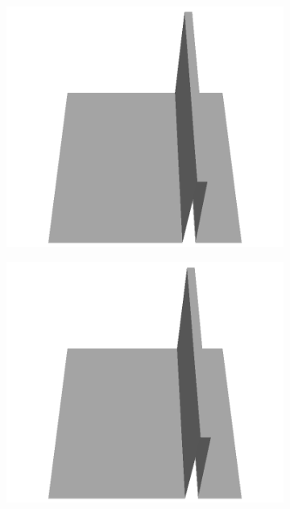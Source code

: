 \documentclass[../document.tex]{subfiles}
\begin{document}
\begin{figure}[H]
\begin{subfigure}[b]{0.065\textwidth}
    \includegraphics[width=\linewidth]{../img/5/custom_patches/walls_front/all/37-3d.png}
    \end{subfigure}
    \begin{subfigure}[b]{0.065\textwidth}
    \includegraphics[width=\linewidth]{../img/5/custom_patches/walls_front/all/36-3d.png}
    \end{subfigure}
    \begin{subfigure}[b]{0.065\textwidth}

\end{subfigure}
\end{figure}
\end{document}
